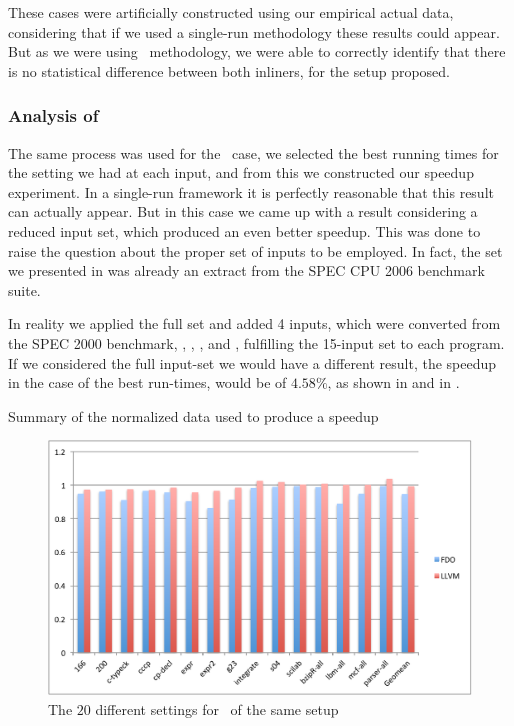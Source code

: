 These cases were artificially constructed using our empirical actual data, considering that if we used a single-run methodology these results could appear. But as we were using \CP\ methodology, we were able to correctly identify that there is no statistical difference between both inliners, for the setup proposed.


\subsubsection{Analysis of \gcc}

The same process was used for the \gcc\ case, we selected the best running times for the setting we had at each input, and from this we constructed our speedup experiment. In a single-run framework it is perfectly reasonable that this result can actually appear. But in this case we came up with a result considering a reduced input set, which produced an even better speedup. This was done to raise the question about the proper set of inputs to be employed. In fact, the set we presented in  was already an extract from the SPEC CPU 2006 benchmark suite.

In reality we applied the full set and added 4 inputs, which were converted from the SPEC 2000 benchmark, \bzip, \lbm, \mcf, and \parser, fulfilling the 15-input set to each program. If we considered the full input-set we would have a different result, the speedup in the case of the best run-times, would be of $4.58 \%$, as shown in  and in .

\begin{table}
  \centering
  \begin{tiny}
  
  \end{tiny}
  \caption{Summary of the normalized data used to produce a speedup}
  \label{tab:fullspeedup}
\end{table}

\begin{figure}
  \centering
  \includegraphics[width=1.00\linewidth]{Figures/speedupgccall}
  \caption{The $20$ different settings for \gzip\ of the same setup}
  \label{fig:gccall}
\end{figure}

